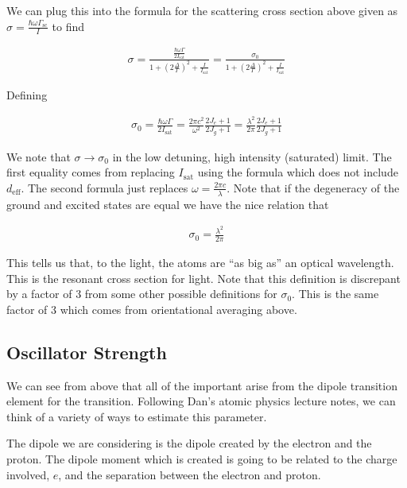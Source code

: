 \documentclass[12pt]{article}
\begin{document}
We can plug this into the formula for the scattering cross section above given as $\sigma = \frac{\hbar \omega \Gamma_{\text{sc}}}{I}$ to find

\begin{align}
\sigma = \frac{\frac{\hbar \omega \Gamma}{2 I_{\text{sat}}}}{1 + \left(2 \frac{\Delta}{\Gamma} \right)^2 + \frac{I}{I_{\text{sat}}}} = \frac{\sigma_0}{1 + \left(2 \frac{\Delta}{\Gamma} \right)^2 + \frac{I}{I_{\text{sat}}}}
\end{align}

Defining 

\begin{align}
\sigma_0 = \frac{\hbar \omega \Gamma}{2I_{\text{sat}}} = \frac{2 \pi c^2}{\omega^2} \frac{2J_e+1}{2J_g+1} = \frac{\lambda^2}{2\pi} \frac{2J_e+1}{2J_g+1} 
\end{align}

We note that $\sigma \rightarrow \sigma_0$ in the low detuning, high intensity (saturated) limit. The first equality comes from replacing $I_{\text{sat}}$ using the formula which does not include $d_{\text{eff}}$. The second formula just replaces $\omega = \frac{2\pi c}{\lambda}$. Note that if the degeneracy of the ground and excited states are equal we have the nice relation that

\begin{align}
\sigma_0 = \frac{\lambda^2}{2\pi}
\end{align}

This tells us that, to the light, the atoms are ``as big as'' an optical wavelength. This is the resonant cross section for light. Note that this definition is discrepant by a factor of 3 from some other possible definitions for $\sigma_0$. This is the same factor of 3 which comes from orientational averaging above.

\subsection{Oscillator Strength}

We can see from above that all of the important arise from the dipole transition element for the transition. Following Dan's atomic physics lecture notes, we can think of a variety of ways to estimate this parameter.

The dipole we are considering is the dipole created by the electron and the proton. The dipole moment which is created is going to be related to the charge involved, $e$, and the separation between the electron and proton. 
\end{document}
